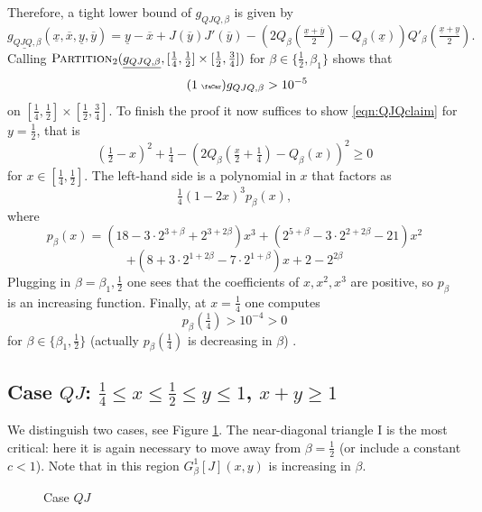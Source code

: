 \documentclass[12pt]{amsart}
\theoremstyle{plain}
\newcommand{\auto}{\tag{\addtocounter{equation}{1}\theequation\;{\tiny\faCar}}}
\theoremstyle{definition}
\theoremstyle{remark}
\numberwithin{equation}{section}
\begin{document}
Therefore, a tight lower bound of $g_{QJQ,\beta}$ is given by
\[ \underline{g_{QJQ,\beta}}(\underline{x},\overline{x},\underline{y},\overline{y}) = \underline{y}-\overline{x} + J(\overline{y})J'(\overline{y}) - (2Q_\beta(\tfrac{\underline{x}+\overline{y}}2)-Q_\beta(\underline{x}))Q'_\beta(\tfrac{\underline{x}+\underline{y}}2). \]
Calling $\textsc{Partition}_2(\underline{g_{QJQ,\beta}},[\frac14,\frac12]\times[\frac12,\frac34])$ for $\beta\in\{\frac12,\beta_1\}$ 
shows that 
\begin{equation}\label{eqn:g_QJQ_auto}\auto g_{QJQ,\beta}>10^{-5}
\end{equation}
on $[\frac14,\frac12]\times [\frac12,\frac34]$. 
To finish the proof it now suffices to show \eqref{eqn:QJQclaim} for $y=\frac12$, that is
\[(\tfrac{1}{2}-x)^2 + \tfrac{1}{4}  - (2Q_\beta(\tfrac{x}{2} + \tfrac{1}{4})-Q_\beta(x))^2 \ge 0 \]
for $x\in [\frac14,\frac12]$.
The left-hand side is a polynomial in $x$ that factors as
\[ \tfrac14(1-2x)^3 p_\beta(x), \]
where
\[ p_\beta(x)= (18- 3\cdot 2^{3 + \beta}+ 
   2^{3 + 2 \beta})x^3 + (2^{5 + \beta}-3\cdot 2^{2 + 2 \beta}- 21)x^2\]\[ + (8+3\cdot 2^{1 + 2 \beta}-7\cdot  2^{1 + \beta})x + 2 - 2^{2 \beta}  \]
Plugging in $\beta=\beta_1,\frac12$ one sees that the coefficients of $x,x^2,x^3$ are positive, so $p_\beta$ is an increasing function. Finally, at $x=\frac14$ one computes 
\[p_\beta(\tfrac14)>10^{-4}>0\]
for $\beta\in \{\beta_1,\frac12\}$ (actually $p_\beta(\tfrac14)$ is decreasing in $\beta$) .

\subsection{\texorpdfstring{Case $QJ$: $\frac14\le x\le \frac12\le y\le 1$, $x+y\ge 1$}{Case QJ}}
\label{sec:caseQJ}
We distinguish two cases, see Figure \ref{fig:qj}.
The near-diagonal triangle I is the most critical: here it is again necessary to move away from $\beta=\frac12$ (or include a constant $c<1$).
Note that in this region $G^1_\beta[J](x,y)$ is increasing in $\beta$.

\begin{figure}[htb]
\centering
{}
\caption{Case $QJ$}
\label{fig:qj}
\end{figure}
\end{document}
